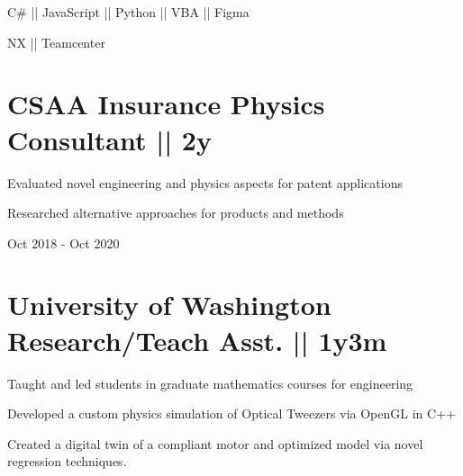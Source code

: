 { \vspace{24ex} \color{cyan}\small
{C\# || JavaScript || Python || VBA || Figma} }

{
\vspace{-2.5ex}\hspace{3.17in} \color{cyan} \small
{NX || Teamcenter} }
\vspace{1ex}


\section
{\textbf{CSAA Insurance} \newline
Physics Consultant || 2y}{}


\begin{detail}
\vspace{-2.5ex}
\BulletItem
Evaluated novel engineering and physics aspects for patent applications

\BulletItem
Researched alternative approaches for products and methods
\end{detail}

\begin{subtitle}
\vspace{-7.8ex}
{{Oct 2018 - Oct 2020}} 
\end{subtitle}

\begin{subtitle}
\vspace{-2.0ex}
\end{subtitle}
\vspace{-1ex}


\section
{\textbf{University of Washington} \newline
Research/Teach Asst. || 1y3m}{}


\begin{detail}
\vspace{-2.5ex}
\BulletItem
Taught and led students in graduate mathematics courses for engineering

\BulletItem
Developed a custom physics simulation of Optical Tweezers via OpenGL in C++

\BulletItem
Created a digital twin of a compliant motor and optimized model via novel regression techniques. 
\end{detail}


